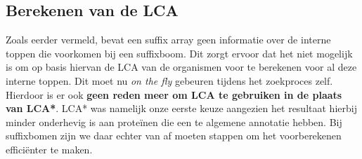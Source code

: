 \subsection{Berekenen van de LCA}\label{subsec:berekenen-van-de-lca}
Zoals eerder vermeld, bevat een suffix array geen informatie over de interne toppen die voorkomen bij een suffixboom.
Dit zorgt ervoor dat het niet mogelijk is om op basis hiervan de LCA van de organismen voor te berekenen voor al deze interne toppen.
Dit moet nu \textit{on the fly} gebeuren tijdens het zoekproces zelf.
Hierdoor is er ook \textbf{geen reden meer om LCA te gebruiken in de plaats van LCA*}.
LCA* was namelijk onze eerste keuze aangezien het resultaat hierbij minder onderhevig is aan proteïnen die een te algemene annotatie hebben.
Bij suffixbomen zijn we daar echter van af moeten stappen om het voorberekenen efficiënter te maken.


